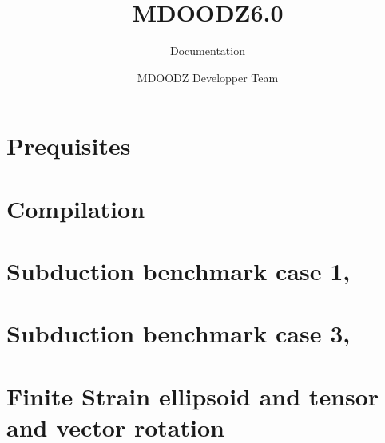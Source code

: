 \documentclass[12pt,english]{scrbook}
\title{MDOODZ6.0}
\author{MDOODZ Developper Team}
\subtitle{Documentation}
\begin{document}
\maketitle
\tableofcontents
{}
\section{Prequisites}
\section{Compilation}
\section{Subduction benchmark case 1, \citet{Schmeling08}}
\section{Subduction benchmark case 3, \citet{Schmeling08}}
\section{Finite Strain ellipsoid and tensor and vector rotation}

 
\end{document}

